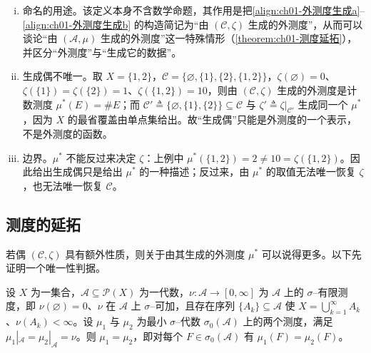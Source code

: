 \documentclass[../../main.tex]{subfiles}%
\begin{document}
\begin{remark}\label{remark:ch01-外测度生成定义}
\begin{enumerate}[(i)]
\item 命名的用途。该定义本身不含数学命题，其作用是把\eqref{align:ch01-外测度生成a}--\eqref{align:ch01-外测度生成b} 的构造简记为“由 $(\mathcal{C},\zeta)$ 生成的外测度”，从而可以谈论“由 $(\mathcal{A},\mu)$ 生成的外测度”这一特殊情形（\cref{theorem:ch01-测度延拓}），并区分“外测度”与“生成它的数据”。
\item 生成偶不唯一。取 $X=\{1,2\}$，$\mathcal{C}=\{\varnothing ,\{1\},\{2\},\{1,2\}\}$，$\zeta(\varnothing )=0$、$\zeta(\{1\})=\zeta(\{2\})=1$、$\zeta(\{1,2\})=10$，则由 $(\mathcal{C},\zeta)$ 生成的外测度是计数测度 $\mu^*(E)=\#E$；而 $\mathcal{C}'\triangleq\{\varnothing ,\{1\},\{2\}\}\subseteq\mathcal{C}$ 与 $\zeta'\triangleq\zeta|_{\mathcal{C}'}$ 生成同一个 $\mu^*$，因为 $X$ 的最省覆盖由单点集给出。故“生成偶”只能是外测度的一个表示，不是外测度的函数。
\item 边界。$\mu^*$ 不能反过来决定 $\zeta$：上例中 $\mu^*(\{1,2\})=2\neq 10=\zeta(\{1,2\})$。因此给出生成偶只是给出 $\mu^*$ 的一种描述；反过来，由 $\mu^*$ 的取值无法唯一恢复 $\zeta$，也无法唯一恢复 $\mathcal{C}$。
\end{enumerate}
\end{remark}

\subsection{测度的延拓}\label{subsection:ch01-测度延拓}

若偶 $(\mathcal{C},\zeta)$ 具有额外性质，则关于由其生成的外测度 $\mu^*$ 可以说得更多。以下先证明一个唯一性判据。

\begin{proposition}[重合准则]\label{proposition:ch01-重合准则}
设 $X$ 为一集合，$\mathcal{A}\subseteq\mathcal{P}(X)$ 为一代数，$\nu:\mathcal{A}\to[0,\infty]$ 为 $\mathcal{A}$ 上的 $\sigma$--有限测度，即 $\nu(\varnothing )=0$、$\nu$ 在 $\mathcal{A}$ 上 $\sigma$--可加，且存在序列 $\{A_k\}\subseteq\mathcal{A}$ 使 $X=\bigcup_{k=1}^\infty A_k$、$\nu(A_k)<\infty$。设 $\mu_1$ 与 $\mu_2$ 为最小 $\sigma$--代数 $\sigma_0(\mathcal{A})$ 上的两个测度，满足 $\mu_1|_{\mathcal{A}}=\mu_2|_{\mathcal{A}}=\nu$。则 $\mu_1=\mu_2$，即对每个 $F\in\sigma_0(\mathcal{A})$ 有 $\mu_1(F)=\mu_2(F)$。
\end{proposition}
\end{document}
